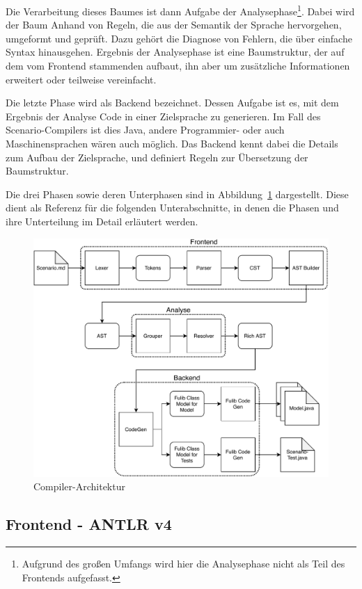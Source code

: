 Die Verarbeitung dieses Baumes ist dann Aufgabe der Analysephase\footnote{Aufgrund des großen Umfangs wird hier die Analysephase nicht als Teil des Frontends aufgefasst.}.
Dabei wird der Baum Anhand von Regeln, die aus der Semantik der Sprache hervorgehen, umgeformt und geprüft.
Dazu gehört die Diagnose von Fehlern, die über einfache Syntax hinausgehen.
Ergebnis der Analysephase ist eine Baumstruktur,
der auf dem vom Frontend stammenden aufbaut, ihn aber um zusätzliche Informationen erweitert oder teilweise vereinfacht.

Die letzte Phase wird als Backend bezeichnet.
Dessen Aufgabe ist es, mit dem Ergebnis der Analyse Code in einer Zielsprache zu generieren.
Im Fall des Scenario-Compilers ist dies Java, andere Programmier- oder auch Maschinensprachen wären auch möglich.
Das Backend kennt dabei die Details zum Aufbau der Zielsprache,
und definiert Regeln zur Übersetzung der Baumstruktur.

Die drei Phasen sowie deren Unterphasen sind in Abbildung~\ref{fig:compiler-architecture} dargestellt.
Diese dient als Referenz für die folgenden Unterabschnitte,
in denen die Phasen und ihre Unterteilung im Detail erläutert werden.

\begin{figure}
    \includegraphics[width=\textwidth]{chapter/fulib-scenarios/img/architecture.pdf}
    \caption{Compiler-Architektur}
    \label{fig:compiler-architecture}
\end{figure}

\subsection{Frontend - ANTLR v4}\label{subsec:frontend-antlr4}

